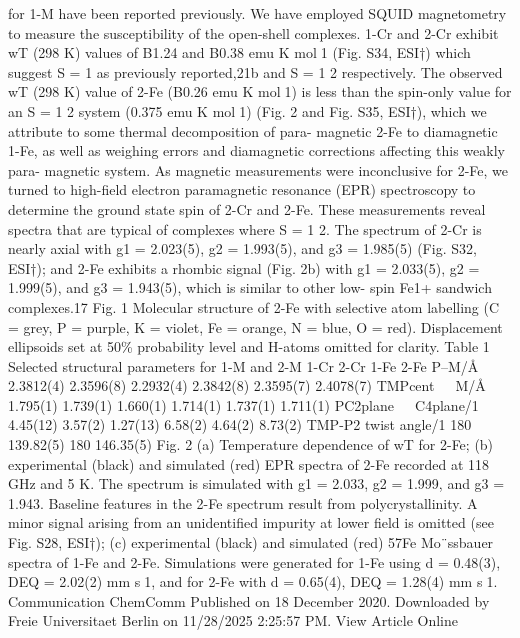 \documentclass{article}
\begin{document}
for 1-M have been reported previously.
We have employed SQUID magnetometry to measure the
susceptibility of the open-shell complexes. 1-Cr and 2-Cr exhibit
wT (298 K) values of B1.24 and B0.38 emu K mol1 (Fig. S34,
ESI†) which suggest S = 1 as previously reported,21b and
S =
1
2 respectively. The observed wT (298 K) value of 2-Fe
(B0.26 emu K mol1) is less than the spin-only value for an
S = 1
2 system (0.375 emu K mol1) (Fig. 2 and Fig. S35, ESI†),
which we attribute to some thermal decomposition of para-
magnetic 2-Fe to diamagnetic 1-Fe, as well as weighing errors
and
diamagnetic
corrections
aﬀecting
this
weakly
para-
magnetic system. As magnetic measurements were inconclusive
for 2-Fe, we turned to high-field electron paramagnetic resonance
(EPR) spectroscopy to determine the ground state spin of 2-Cr
and 2-Fe. These measurements reveal spectra that are typical of
complexes where S = 1
2. The spectrum of 2-Cr is nearly axial with
g1 = 2.023(5), g2 = 1.993(5), and g3 = 1.985(5) (Fig. S32, ESI†); and
2-Fe exhibits a rhombic signal (Fig. 2b) with g1 = 2.033(5),
g2 = 1.999(5), and g3 = 1.943(5), which is similar to other low-
spin Fe1+ sandwich complexes.17
Fig. 1
Molecular structure of 2-Fe with selective atom labelling (C = grey,
P = purple, K = violet, Fe = orange, N = blue, O = red). Displacement
ellipsoids set at 50\% probability level and H-atoms omitted for clarity.
Table 1
Selected structural parameters for 1-M and 2-M
1-Cr
2-Cr
1-Fe
2-Fe
P–M/Å
2.3812(4)
2.3596(8)
2.2932(4)
2.3842(8)
2.3595(7)
2.4078(7)
TMPcent  M/Å
1.795(1)
1.739(1)
1.660(1)
1.714(1)
1.737(1)
1.711(1)
PC2plane  C4plane/1
4.45(12)
3.57(2)
1.27(13)
6.58(2)
4.64(2)
8.73(2)
TMP-P2 twist angle/1
180
139.82(5)
180
146.35(5)
Fig. 2
(a) Temperature dependence of wT for 2-Fe; (b) experimental
(black) and simulated (red) EPR spectra of 2-Fe recorded at 118 GHz and
5 K. The spectrum is simulated with g1 = 2.033, g2 = 1.999, and g3 = 1.943.
Baseline features in the 2-Fe spectrum result from polycrystallinity.
A minor signal arising from an unidentified impurity at lower field is omitted
(see Fig. S28, ESI†); (c) experimental (black) and simulated (red)
57Fe
Mo¨ssbauer spectra of 1-Fe and 2-Fe. Simulations were generated for
1-Fe using d = 0.48(3), DEQ = 2.02(2) mm s1, and for 2-Fe with
d = 0.65(4), DEQ = 1.28(4) mm s1.
Communication
ChemComm
Published on 18 December 2020. Downloaded by Freie Universitaet Berlin on 11/28/2025 2:25:57 PM. 
View Article Online

\newpage

\end{document}
